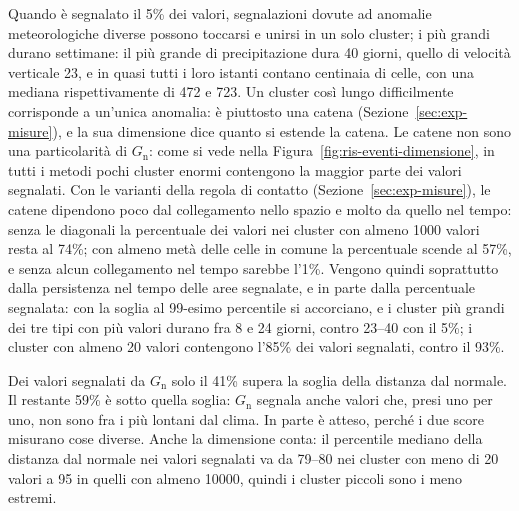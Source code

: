 Quando è segnalato il 5\% dei valori, segnalazioni dovute ad anomalie meteorologiche diverse possono toccarsi e unirsi in un solo cluster; i più grandi durano settimane: il più grande di precipitazione dura 40 giorni, quello di velocità verticale 23, e in quasi tutti i loro istanti contano centinaia di celle, con una mediana rispettivamente di 472 e 723. Un cluster così lungo difficilmente corrisponde a un'unica anomalia: è piuttosto una catena (Sezione~\ref{sec:exp-misure}), e la sua dimensione dice quanto si estende la catena. Le catene non sono una particolarità di $G_{\mathrm{n}}$: come si vede nella Figura~\ref{fig:ris-eventi-dimensione}, in tutti i metodi pochi cluster enormi contengono la maggior parte dei valori segnalati. Con le varianti della regola di contatto (Sezione~\ref{sec:exp-misure}), le catene dipendono poco dal collegamento nello spazio e molto da quello nel tempo: senza le diagonali la percentuale dei valori nei cluster con almeno 1000 valori resta al 74\%; con almeno metà delle celle in comune la percentuale scende al 57\%, e senza alcun collegamento nel tempo sarebbe l'1\%. Vengono quindi soprattutto dalla persistenza nel tempo delle aree segnalate, e in parte dalla percentuale segnalata: con la soglia al 99-esimo percentile si accorciano, e i cluster più grandi dei tre tipi con più valori durano fra 8 e 24 giorni, contro 23--40 con il 5\%; i cluster con almeno 20 valori contengono l'85\% dei valori segnalati, contro il 93\%.

Dei valori segnalati da $G_{\mathrm{n}}$ solo il 41\% supera la soglia della distanza dal normale. Il restante 59\% è sotto quella soglia: $G_{\mathrm{n}}$ segnala anche valori che, presi uno per uno, non sono fra i più lontani dal clima. In parte è atteso, perché i due score misurano cose diverse. Anche la dimensione conta: il percentile mediano della distanza dal normale nei valori segnalati va da 79--80 nei cluster con meno di 20 valori a 95 in quelli con almeno 10000, quindi i cluster piccoli sono i meno estremi.

